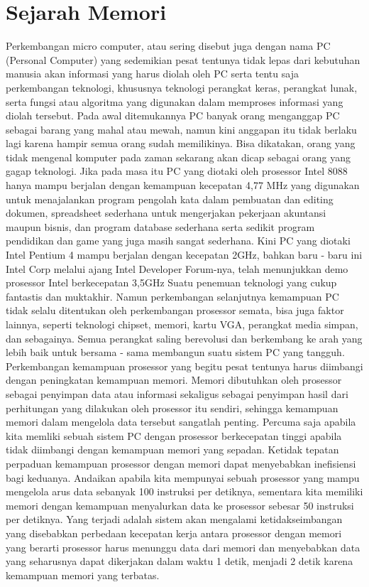 \documentclass{article}
\begin{document}
\section{Sejarah Memori}
Perkembangan micro computer, atau sering disebut juga dengan nama PC (Personal Computer) yang sedemikian pesat tentunya tidak lepas dari kebutuhan manusia akan informasi yang harus diolah oleh PC serta tentu saja perkembangan teknologi, khususnya teknologi perangkat keras, perangkat lunak, serta fungsi atau algoritma yang digunakan dalam memproses informasi yang diolah tersebut.
Pada awal ditemukannya PC banyak orang menganggap PC sebagai barang yang mahal atau mewah, namun kini anggapan itu tidak berlaku lagi karena hampir semua orang sudah memilikinya. Bisa dikatakan, orang yang tidak mengenal komputer pada zaman sekarang akan dicap sebagai orang yang gagap teknologi. Jika pada masa itu PC yang diotaki oleh prosessor Intel 8088 hanya mampu berjalan dengan kemampuan kecepatan 4,77 MHz yang digunakan untuk menajalankan program pengolah kata dalam pembuatan dan editing dokumen, spreadsheet sederhana untuk mengerjakan pekerjaan akuntansi maupun bisnis, dan program database sederhana serta sedikit program pendidikan dan game yang juga masih sangat sederhana. Kini PC yang diotaki Intel Pentium 4 mampu berjalan dengan kecepatan 2GHz, bahkan baru - baru ini Intel Corp melalui ajang Intel Developer Forum-nya, telah menunjukkan demo prosessor Intel berkecepatan 3,5GHz Suatu penemuan teknologi yang cukup fantastis dan muktakhir. Namun perkembangan selanjutnya kemampuan PC tidak selalu ditentukan oleh perkembangan prosessor semata, bisa juga faktor lainnya, seperti teknologi chipset, memori, kartu VGA, perangkat media simpan, dan sebagainya. Semua perangkat saling berevolusi dan berkembang ke arah yang lebih baik untuk bersama - sama membangun suatu sistem PC yang tangguh. Perkembangan kemampuan prosessor yang begitu pesat tentunya harus diimbangi dengan peningkatan kemampuan memori. Memori dibutuhkan oleh prosessor sebagai penyimpan data atau informasi sekaligus sebagai penyimpan hasil dari perhitungan yang dilakukan oleh prosessor itu sendiri, sehingga kemampuan memori dalam mengelola data tersebut sangatlah penting. Percuma saja apabila kita memliki sebuah sistem PC dengan prosessor berkecepatan tinggi apabila tidak diimbangi dengan kemampuan memori yang sepadan. Ketidak tepatan perpaduan kemampuan prosessor dengan memori dapat menyebabkan inefisiensi bagi keduanya. Andaikan apabila kita mempunyai sebuah prosessor yang mampu mengelola arus data sebanyak 100 instruksi per detiknya, sementara kita memiliki memori dengan kemampuan menyalurkan data ke prosessor sebesar 50 instruksi per detiknya. Yang terjadi adalah sistem akan mengalami ketidakseimbangan yang disebabkan perbedaan kecepatan kerja antara prosessor dengan memori yang berarti prosessor harus menunggu data dari memori dan menyebabkan data yang seharusnya dapat dikerjakan dalam waktu 1 detik, menjadi 2 detik karena kemampuan memori yang terbatas. 
\end{document}
